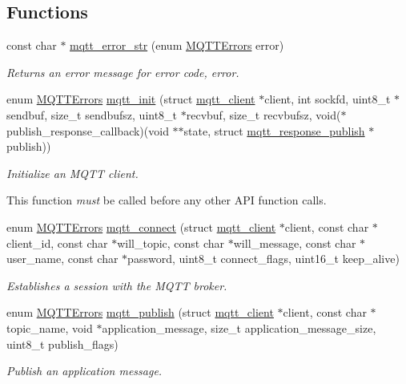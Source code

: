 \subsection*{Functions}
\begin{DoxyCompactItemize}
\item 
const char $\ast$ \hyperlink{group__api_ga47b62bdd24e8b05957825d2419d7c848}{mqtt\+\_\+error\+\_\+str} (enum \hyperlink{group__api_gad0c901a8d30691ed0ca17915b691b7e7}{M\+Q\+T\+T\+Errors} error)
\begin{DoxyCompactList}\small\item\em Returns an error message for error code, {\ttfamily error}. \end{DoxyCompactList}\item 
enum \hyperlink{group__api_gad0c901a8d30691ed0ca17915b691b7e7}{M\+Q\+T\+T\+Errors} \hyperlink{group__api_gab07105b049dd86a8ec39c518cf9fa4c7}{mqtt\+\_\+init} (struct \hyperlink{structmqtt__client}{mqtt\+\_\+client} $\ast$client, int sockfd, uint8\+\_\+t $\ast$sendbuf, size\+\_\+t sendbufsz, uint8\+\_\+t $\ast$recvbuf, size\+\_\+t recvbufsz, void($\ast$publish\+\_\+response\+\_\+callback)(void $\ast$$\ast$state, struct \hyperlink{structmqtt__response__publish}{mqtt\+\_\+response\+\_\+publish} $\ast$publish))
\begin{DoxyCompactList}\small\item\em Initialize an M\+Q\+TT client.

This function {\itshape must} be called before any other A\+PI function calls. \end{DoxyCompactList}\item 
enum \hyperlink{group__api_gad0c901a8d30691ed0ca17915b691b7e7}{M\+Q\+T\+T\+Errors} \hyperlink{group__api_gac8e25ff4f74aa7964b2b2ccbcfa23788}{mqtt\+\_\+connect} (struct \hyperlink{structmqtt__client}{mqtt\+\_\+client} $\ast$client, const char $\ast$client\+\_\+id, const char $\ast$will\+\_\+topic, const char $\ast$will\+\_\+message, const char $\ast$user\+\_\+name, const char $\ast$password, uint8\+\_\+t connect\+\_\+flags, uint16\+\_\+t keep\+\_\+alive)
\begin{DoxyCompactList}\small\item\em Establishes a session with the M\+Q\+TT broker. \end{DoxyCompactList}\item 
enum \hyperlink{group__api_gad0c901a8d30691ed0ca17915b691b7e7}{M\+Q\+T\+T\+Errors} \hyperlink{group__api_ga0d8fed24a799ab9b55eeb28f3cd2d0a8}{mqtt\+\_\+publish} (struct \hyperlink{structmqtt__client}{mqtt\+\_\+client} $\ast$client, const char $\ast$topic\+\_\+name, void $\ast$application\+\_\+message, size\+\_\+t application\+\_\+message\+\_\+size, uint8\+\_\+t publish\+\_\+flags)
\begin{DoxyCompactList}\small\item\em Publish an application message.


\end{DoxyCompactList}
\end{DoxyCompactItemize}
